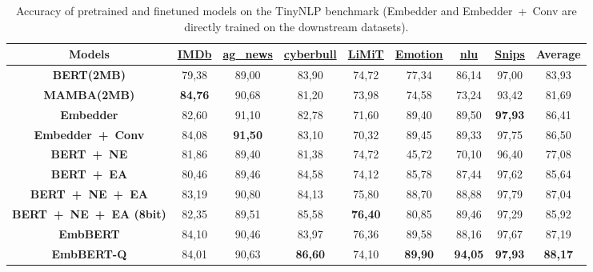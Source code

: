 
\begin{table*}[htbp]
    \caption{Accuracy of pretrained and finetuned models on the TinyNLP benchmark (Embedder and Embedder~+~Conv are directly trained on the downstream datasets).}
    \begin{center}
        \begin{tabular}{| c | c c c c c c c c |}
        \hline
        \textbf{Models} & \href{https://huggingface.co/datasets/stanfordnlp/imdb}{\textbf{IMDb}} & \href{https://huggingface.co/datasets/fancyzhx/ag_news}{\textbf{ag\_news}} & \href{https://www.kaggle.com/datasets/andrewmvd/cyberbullying-classification}{\textbf{cyberbull}} & \href{https://huggingface.co/datasets/IBM/limit}{\textbf{LiMiT}} & \href{https://huggingface.co/datasets/dair-ai/emotion}{\textbf{Emotion}} & \href{https://huggingface.co/datasets/xingkunliuxtracta/nlu_evaluation_data}{\textbf{nlu}} & \href{https://huggingface.co/datasets/benayas/snips}{\textbf{Snips}} & \textbf{Average} \\
        \hline \hline
        \textbf{BERT(2MB)}           & 79,38 & 89,00 & 83,90 & 74,72 & 77,34 & 86,14 & 97,00 & 83,93 \\
        \textbf{MAMBA(2MB)}          & \textbf{84,76} & 90,68 & 81,20 & 73,98 & 74,58 & 73,24 & 93,42 & 81,69 \\
        \textbf{Embedder}           & 82,60 & 91,10 & 82,78 & 71,60 & 89,40 & 89,50 & \textbf{97,93} & 86,41 \\
        \textbf{Embedder~+~Conv}      & 84,08 & \textbf{91,50} & 83,10 & 70,32 & 89,45 & 89,33 & 97,75 & 86,50 \\
        \textbf{BERT~+~NE}            & 81,86 & 89,40 & 81,38 & 74,72 & 45,72 & 70,10 & 96,40 & 77,08 \\
        \textbf{BERT~+~EA}            & 80,46 & 89,46 & 84,58 & 74,12 & 85,78 & 87,44 & 97,62 & 85,64 \\
        \textbf{BERT~+~NE~+~EA}         & 83,19 & 90,80 & 84,13 & 75,80 & 88,70 & 88,88 & 97,79 & 87,04 \\
        \textbf{BERT~+~NE~+~EA (8bit)}  & 82,35 & 89,51 & 85,58 & \textbf{76,40} & 80,85 & 89,46 & 97,29 & 85,92 \\
        \hline
        \textbf{EmbBERT}            & 84,10 & 90,46 & 83,97 & 76,36 & 89,58 & 88,16 & 97,67 & 87,19 \\
        \textbf{EmbBERT-Q}      & 84,01 & 90,63 & \textbf{86,60} & 74,10 & \textbf{89,90} & \textbf{94,05} & \textbf{97,93} & \textbf{88,17} \\
        \hline
        \end{tabular}
        \label{table:all_results_tinyNLP_acc}
    \end{center} 
\end{table*}


